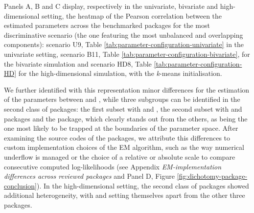 Panels A, B and C display, respectively in the univariate, bivariate and high-dimensional setting, the heatmap of the Pearson correlation between the estimated parameters across the benchmarked packages for the most discriminative scenario (the one featuring the most unbalanced and overlapping components): scenario U9, Table \ref{tab:parameter-configuration-univariate} in the univariate setting, scenario B11, Table \ref{tab:parameter-configuration-bivariate}, for the bivariate simulation and scenario HD8, Table \ref{tab:parameter-configuration-HD} for the high-dimensional simulation, with the \emph{k}-means initialisation.

We further identified with this representation minor differences for the estimation of the parameters between  and , while three subgroups can be identified in the second class of packages: the first subset with  and , the second subset with  and  packages and the  package, which clearly stands out from the others, as being the one most likely to be trapped at the boundaries of the parameter space. After examining the source codes of the packages, we attribute this differences to custom implementation choices of the EM algorithm, such as the way numerical underflow is managed or the choice of a relative or absolute scale to compare consecutive computed log-likelihoods (see Appendix \emph{EM-implementation differences across reviewed packages} and Panel D, Figure \ref{fig:dichotomy-package-conclusion}). In the high-dimensional setting, the second class of packages showed additional heterogeneity, with  and  setting themselves apart from the other three packages.

